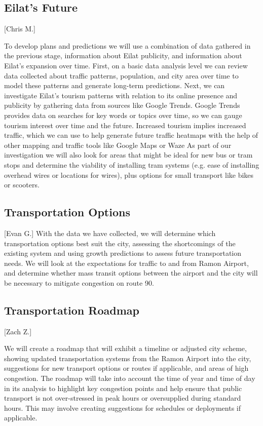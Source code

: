 \documentclass[12pt]{article}                         %
\begin{document}
\subsection{Eilat's Future}[Chris M.]

To develop plans and predictions we will use a combination of data gathered in the previous stage, information about Eilat publicity, and information about Eilat's expansion over time. First, on a basic data analysis level we can review data collected about traffic patterns, population, and city area over time to model these patterns and generate long-term predictions. Next, we can investigate Eilat's tourism patterns with relation to its online presence and publicity by gathering data from sources like Google Trends. Google Trends provides data on searches for key words or topics over time, so we can gauge tourism interest over time and the future. Increased tourism implies increased traffic, which we can use to help generate future traffic heatmaps with the help of other mapping and traffic tools like Google Maps or Waze As part of our investigation we will also look for areas that might be ideal for new bus or tram stops and determine the viability of installing tram systems (e.g. ease of installing overhead wires or locations for wires), plus options for small transport like bikes or scooters.

\subsection{Transportation Options}[Evan G.]
With the data we have collected, we will determine which transportation options best suit the city, assessing the shortcomings of the existing system and using growth predictions to assess future transportation needs. We will look at the expectations for traffic to and from Ramon Airport, and determine whether mass transit options between the airport and the city will be necessary to mitigate congestion on route 90. 

\subsection{Transportation Roadmap}[Zach Z.]

We will create a roadmap that will exhibit a timeline or adjusted city scheme, showing updated transportation systems from the Ramon Airport into the city, suggestions for new transport options or routes if applicable, and areas of high congestion. The roadmap will take into account the time of year and time of day in its analysis to highlight key congestion points and help ensure that public transport is not over-stressed in peak hours or oversupplied during standard hours. This may involve creating suggestions for schedules or deployments if applicable.

\newpage


\end{document}
